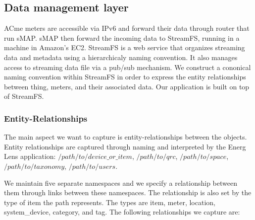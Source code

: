 

\subsection{Data management layer}
ACme meters are accessible via IPv6 and forward their data through router that run sMAP.  sMAP then forward the incoming data
to StreamFS, running in a machine in Amazon's EC2.  StreamFS is a web service that organizes streaming data and metadata using
a hierarchicaly naming convention.  It also manages access to streaming data file via a pub/sub mechanism.  We construct 
a cononical naming convention within StreamFS in order to express the entity relationships between thing, meters, and their 
associated data.  Our application is built on top of StreamFS.

\subsubsection{Entity-Relationships}
The main aspect we want to capture is entity-relationships between the objects.  Entity relationships are captured through naming and 
interpreted by the Energ Lens application: $/path/to/device\_or\_item$, $/path/to/qrc$, $/path/to/space$, $/path/to/taxonomy$, 
$/path/to/users$.

We maintain five separate namespaces and we specify a relationship between them through links between 
these namespaces.  The relationship is also set by the type of item the path represents.  The types are item, meter, 
location, system\_device, category, and tag.  The following relationships we capture are:

